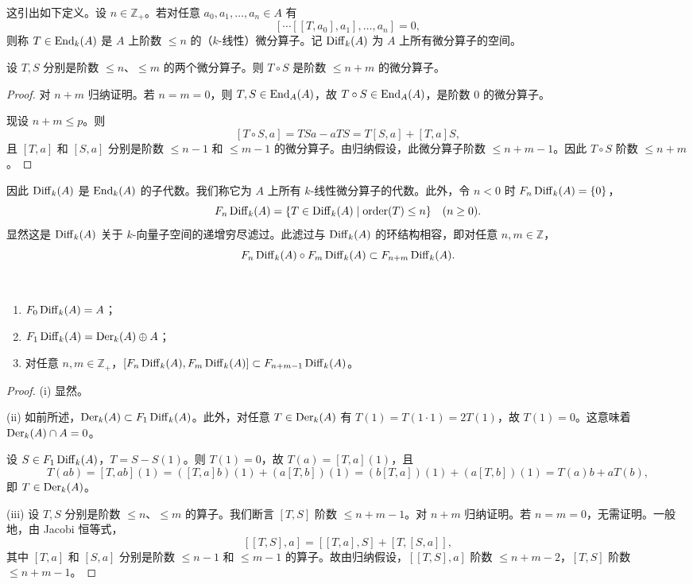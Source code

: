 这引出如下定义。设 $n\in\mathbb{Z}_+$。若对任意 $a_0,a_1,\dots,a_n\in A$ 有
$$[\cdots[[T,a_0],a_1],\dots,a_n]=0,$$
则称 $T\in\operatorname{End}_k(A)$ 是 $A$ 上阶数 $\le n$ 的（$k$-线性）微分算子。记 $\operatorname{Diff}_k(A)$ 为 $A$ 上所有微分算子的空间。

\begin{lemma}
设 $T,S$ 分别是阶数 $\le n$、$\le m$ 的两个微分算子。则 $T\circ S$ 是阶数 $\le n+m$ 的微分算子。
\end{lemma}

\begin{proof}
对 $n+m$ 归纳证明。若 $n=m=0$，则 $T,S\in\operatorname{End}_A(A)$，故 $T\circ S\in\operatorname{End}_A(A)$，是阶数 $0$ 的微分算子。

现设 $n+m\le p$。则
$$[T\circ S,a]=TSa-aTS=T[S,a]+[T,a]S,$$
且 $[T,a]$ 和 $[S,a]$ 分别是阶数 $\le n-1$ 和 $\le m-1$ 的微分算子。由归纳假设，此微分算子阶数 $\le n+m-1$。因此 $T\circ S$ 阶数 $\le n+m$。
\end{proof}

因此 $\operatorname{Diff}_k(A)$ 是 $\operatorname{End}_k(A)$ 的子代数。我们称它为 $A$ 上所有 $k$-线性微分算子的代数。此外，令 $n<0$ 时 $F_n\operatorname{Diff}_k(A)=\{0\}$，
$$F_n\operatorname{Diff}_k(A)=\{T\in\operatorname{Diff}_k(A)\mid \operatorname{order}(T)\le n\}\quad(n\ge 0).$$
显然这是 $\operatorname{Diff}_k(A)$ 关于 $k$-向量子空间的递增穷尽滤过。此滤过与 $\operatorname{Diff}_k(A)$ 的环结构相容，即对任意 $n,m\in\mathbb{Z}$，
$$F_n\operatorname{Diff}_k(A)\circ F_m\operatorname{Diff}_k(A)\subset F_{n+m}\operatorname{Diff}_k(A).$$

\begin{lemma}\ 
\begin{enumerate}[label=(\roman*)]
  \item $F_0\operatorname{Diff}_k(A)=A$；
  \item $F_1\operatorname{Diff}_k(A)=\operatorname{Der}_k(A)\oplus A$；
  \item 对任意 $n,m\in\mathbb{Z}_+$，$[F_n\operatorname{Diff}_k(A),F_m\operatorname{Diff}_k(A)]\subset F_{n+m-1}\operatorname{Diff}_k(A)$。
\end{enumerate}
\end{lemma}

\begin{proof}
(i) 显然。

(ii) 如前所述，$\operatorname{Der}_k(A)\subset F_1\operatorname{Diff}_k(A)$。此外，对任意 $T\in\operatorname{Der}_k(A)$ 有 $T(1)=T(1\cdot 1)=2T(1)$，故 $T(1)=0$。这意味着 $\operatorname{Der}_k(A)\cap A=0$。

设 $S\in F_1\operatorname{Diff}_k(A)$，$T=S-S(1)$。则 $T(1)=0$，故 $T(a)=[T,a](1)$，且
$$T(ab)=[T,ab](1)=([T,a]b)(1)+(a[T,b])(1)=(b[T,a])(1)+(a[T,b])(1)=T(a)b+aT(b),$$
即 $T\in\operatorname{Der}_k(A)$。

(iii) 设 $T,S$ 分别是阶数 $\le n$、$\le m$ 的算子。我们断言 $[T,S]$ 阶数 $\le n+m-1$。对 $n+m$ 归纳证明。若 $n=m=0$，无需证明。一般地，由 Jacobi 恒等式，
$$[[T,S],a]=[[T,a],S]+[T,[S,a]],$$
其中 $[T,a]$ 和 $[S,a]$ 分别是阶数 $\le n-1$ 和 $\le m-1$ 的算子。故由归纳假设，$[[T,S],a]$ 阶数 $\le n+m-2$，$[T,S]$ 阶数 $\le n+m-1$。
\end{proof}

